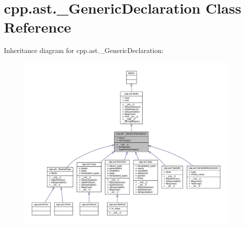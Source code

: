 \hypertarget{classcpp_1_1ast_1_1__GenericDeclaration}{}\section{cpp.\+ast.\+\_\+\+Generic\+Declaration Class Reference}
\label{classcpp_1_1ast_1_1__GenericDeclaration}


Inheritance diagram for cpp.\+ast.\+\_\+\+Generic\+Declaration\+:
\nopagebreak
\begin{figure}[H]
\begin{center}
\leavevmode
\includegraphics[width=350pt]{classcpp_1_1ast_1_1__GenericDeclaration__inherit__graph}
\end{center}
\end{figure}



